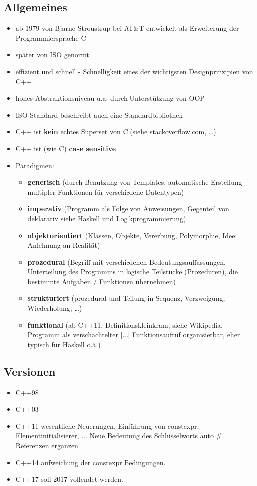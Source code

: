 \documentclass[a4paper]{report}
\begin{document}
\subsection{Allgemeines}
\begin{itemize}
\item ab 1979 von Bjarne Stroustrup bei AT\&T entwickelt als Erweiterung der Programmiersprache C
\item später von ISO genormt
\vspace{2ex}
\item effizient und schnell - Schnelligkeit eines der wichtigsten Designprinzipien von C++
\item hohes Abstraktionsniveau u.a. durch Unterstützung von OOP
\item ISO Standard beschreibt auch eine Standardbibliothek
\item C++ ist \textbf{kein} echtes Superset von C (siehe stackoverflow.com, \dots)
\item C++ ist (wie C) \textbf{case sensitive}
\vspace{2ex}

\item Paradigmen:
	\begin{itemize}
		\item \textbf{generisch} (durch Benutzung von Templates, automatische Erstellung multipler Funktionen für verschiedene Datentypen)
		\item \textbf{imperativ} (Programm als Folge von Anweisungen, Gegenteil von deklarativ siehe Haskell und Logikprogrammierung)
		\item \textbf{objektorientiert} (Klassen, Objekte, Vererbung, Polymorphie, Idee: Anlehnung an Realität)
		\item \textbf{prozedural} (Begriff mit verschiedenen Bedeutungsauffassungen, Unterteilung des Programms in logische Teilstücke (Prozeduren), die bestimmte Aufgaben / Funktionen übernehmen)
		\item \textbf{strukturiert} (prozedural und Teilung in Sequenz, Verzweigung, Wiederholung, \dots )
		\item \textbf{funktional} (ab C++11, Definitionskleinkram, siehe Wikipedia, Programm als verschachtelter [...] Funktionsaufruf 	organisierbar, eher typisch für Haskell o.ä.)
	\end{itemize}
\end{itemize}

\subsection{Versionen}
\begin{itemize}
	\item C++98
	\item C++03
	\item C++11
	\subitem wesentliche Neuerungen. Einführung von constexpr, Elementinitialisierer, ... Neue Bedeutung des Schlüsselworts auto \hspace{3cm} \# Referenzen ergänzen %
	\item C++14
	\subitem aufweichung der constexpr Bedingungen.
	\item C++17
	\subitem soll 2017 vollendet werden.
\end{itemize}
\end{document}
